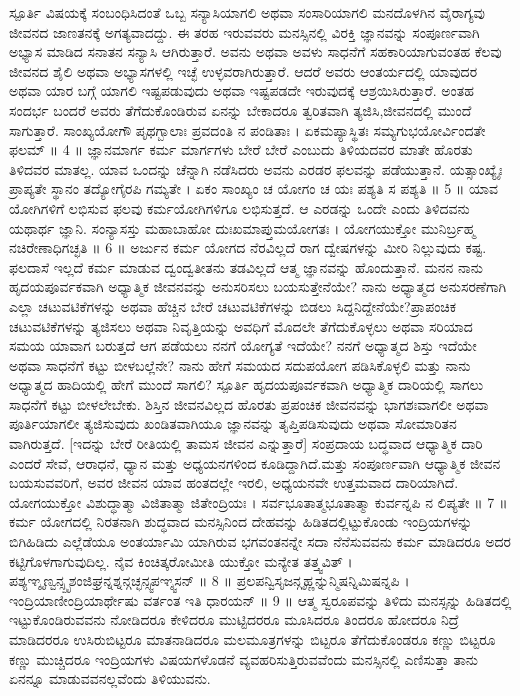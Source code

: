  ಸ್ಪೂರ್ತಿ 
 ವಿಷಯಕ್ಕೆ ಸಂಬಂಧಿಸಿದಂತೆ ಒಬ್ಬ ಸನ್ಯಾಸಿಯಾಗಲಿ ಅಥವಾ ಸಂಸಾರಿಯಾಗಲಿ ಮನದೊಳಗಿನ ವೈರಾಗ್ಯವು ಜೀವನದ ಜಾಣತನಕ್ಕೆ ಅಗತ್ಯವಾದದ್ದು. ಈ ತರಹ ಇರುವವರು ಮನಸ್ಸಿನಲ್ಲಿ ವಿರಕ್ತಿ ಜ್ಞಾನವನ್ನು ಸಂಪೂರ್ಣವಾಗಿ ಅಭ್ಯಾಸ ಮಾಡಿದ ಸನಾತನ ಸನ್ಯಾಸಿ ಆಗಿರುತ್ತಾರೆ. ಅವನು ಅಥವಾ ಅವಳು ಸಾಧನೆಗೆ ಸಹಕಾರಿಯಾಗುವಂತಹ ಕೆಲವು ಜೀವನದ ಶೈಲಿ ಅಥವಾ ಅಭ್ಯಾಸಗಳಲ್ಲಿ ಇಚ್ಛೆ ಉಳ್ಳವರಾಗಿರುತ್ತಾರೆ. ಆದರೆ ಅವರು ಆಂತರ್ಯದಲ್ಲಿ ಯಾವುದರ ಅಥವಾ ಯಾರ ಬಗ್ಗೆ ಯಾಗಲಿ ಇಷ್ಟಪಡುವುದು ಅಥವಾ ಇಷ್ಟಪಡದೇ ಇರುವುದಕ್ಕೆ ಆಶ್ರಯಿಸಿರುತ್ತಾರೆ. ಅಂತಹ ಸಂದರ್ಭ ಬಂದರೆ ಅವರು ತೆಗೆದುಕೊಂಡಿರುವ ಏನನ್ನು ಬೇಕಾದರೂ ತ್ವರಿತವಾಗಿ ತ್ಯಜಿಸಿ,ಜೀವನದಲ್ಲಿ ಮುಂದೆ ಸಾಗುತ್ತಾರೆ.
ಸಾಂಖ್ಯಯೋಗೌ ಪೃಥಗ್ಬಾಲಾಃ ಪ್ರವದಂತಿ ನ ಪಂಡಿತಾಃ ।
ಏಕಮಪ್ಯಾಸ್ಥಿತಃ ಸಮ್ಯಗುಭಯೋರ್ವಿಂದತೇ ಫಲಮ್ ॥ 4  ॥
 ಜ್ಞಾನಮಾರ್ಗ ಕರ್ಮ ಮಾರ್ಗಗಳು ಬೇರೆ ಬೇರೆ ಎಂಬುದು ತಿಳಿಯದವರ ಮಾತೇ ಹೊರತು ತಿಳಿದವರ ಮಾತಲ್ಲ. ಯಾವ ಒಂದನ್ನು ಚೆನ್ನಾಗಿ ನಡೆಸಿದರು ಅವನು ಎರಡರ ಫಲವನ್ನು ಪಡೆಯುತ್ತಾನೆ.
ಯತ್ಸಾಂಖ್ಯೈಃ ಪ್ರಾಪ್ಯತೇ ಸ್ಥಾನಂ ತದ್ಯೋಗೈರಪಿ ಗಮ್ಯತೇ ।
ಏಕಂ ಸಾಂಖ್ಯಂ ಚ ಯೋಗಂ ಚ ಯಃ ಪಶ್ಯತಿ ಸ ಪಶ್ಯತಿ ॥ 5 ॥
 ಯಾವ ಯೋಗಿಗಳಿಗೆ ಲಭಿಸುವ ಫಲವು ಕರ್ಮಯೋಗಿಗಳಿಗೂ ಲಭಿಸುತ್ತದೆ. ಆ ಎರಡನ್ನು ಒಂದೇ ಎಂದು ತಿಳಿದವನು ಯಥಾರ್ಥ ಜ್ಞಾನಿ.
ಸಂನ್ಯಾಸಸ್ತು ಮಹಾಬಾಹೋ ದುಃಖಮಾಪ್ತುಮಯೋಗತಃ ।
ಯೋಗಯುಕ್ತೋ ಮುನಿರ್ಬ್ರಹ್ಮ ನಚಿರೇಣಾಧಿಗಚ್ಛತಿ ॥ 6 ॥
 ಅರ್ಜುನ ಕರ್ಮ ಯೋಗದ ನೆರವಿಲ್ಲದೆ ರಾಗ ದ್ವೇಷಗಳನ್ನು ಮೀರಿ ನಿಲ್ಲುವುದು ಕಷ್ಟ. ಫಲದಾಸೆ ಇಲ್ಲದೆ ಕರ್ಮ ಮಾಡುವ ದ್ವಂದ್ವತೀತನು ತಡವಿಲ್ಲದೆ ಆತ್ಮ ಜ್ಞಾನವನ್ನು ಹೊಂದುತ್ತಾನೆ.
ಮನನ 
ನಾನು ಹೃದಯಪೂರ್ವಕವಾಗಿ ಅಧ್ಯಾತ್ಮಿಕ ಜೀವನವನ್ನು ಅನುಸರಿಸಲು ಬಯಸುತ್ತೇನೆಯೇ? ನಾನು ಅಧ್ಯಾತ್ಮದ ಅನುಸರಣೆಗಾಗಿ ಎಲ್ಲಾ ಚಟುವಟಿಕೆಗಳನ್ನು ಅಥವಾ ಹೆಚ್ಚಿನ ಬೇರೆ ಚಟುವಟಿಕೆಗಳನ್ನು ಬಿಡಲು ಸಿದ್ದನಿದ್ದೇನೆಯೇ?ಪ್ರಾಪಂಚಿಕ ಚಟುವಟಿಕೆಗಳನ್ನು ತ್ಯಜಿಸಲು ಅಥವಾ ನಿವೃತ್ತಿಯನ್ನು ಅವಧಿಗೆ ಮೊದಲೇ ತೆಗೆದುಕೊಳ್ಳಲು ಅಥವಾ ಸರಿಯಾದ ಸಮಯ ಯಾವಾಗ ಬರುತ್ತದೆ ಆಗ ಪಡೆಯಲು ನನಗೆ ಯೋಗ್ಯತೆ ಇದೆಯೇ? ನನಗೆ ಅಧ್ಯಾತ್ಮದ ಶಿಸ್ತು ಇದೆಯೇ ಅಥವಾ ಸಾಧನೆಗೆ ಕಟ್ಟು ಬೀಳಬಲ್ಲೆನೇ? ನಾನು ಹೇಗೆ ಸಮಯದ ಸದುಪಯೋಗ ಪಡಿಸಿಕೊಳ್ಳಲಿ ಮತ್ತು ನಾನು ಅಧ್ಯಾತ್ಮದ ಹಾದಿಯಲ್ಲಿ ಹೇಗೆ ಮುಂದೆ ಸಾಗಲಿ?
 ಸ್ಪೂರ್ತಿ 
 ಹೃದಯಪೂರ್ವಕವಾಗಿ ಅಧ್ಯಾತ್ಮಿಕ ದಾರಿಯಲ್ಲಿ ಸಾಗಲು ಸಾಧನೆಗೆ ಕಟ್ಟು ಬೀಳಲೇಬೇಕು. ಶಿಸ್ತಿನ ಜೀವನವಿಲ್ಲದ ಹೊರತು ಪ್ರಪಂಚಿಕ ಜೀವನವನ್ನು ಭಾಗಶಃವಾಗಲೀ ಅಥವಾ ಪೂರ್ತಿಯಾಗಲೀ ತ್ಯಜಿಸುವುದು ಖಂಡಿತವಾಗಿಯೂ ಜ್ಞಾನವನ್ನು ತೃಪ್ತಿಪಡಿಸುವುದು ಅಥವಾ ಸೋಮಾರಿತನ ವಾಗಿರುತ್ತದೆ. [ಇದನ್ನು ಬೇರೆ ರೀತಿಯಲ್ಲಿ ತಾಮಸ ಜೀವನ ಎನ್ನುತ್ತಾರೆ] ಸಂಪ್ರದಾಯ ಬದ್ಧವಾದ ಆಧ್ಯಾತ್ಮಿಕ ದಾರಿ ಎಂದರೆ ಸೇವೆ, ಆರಾಧನೆ, ಧ್ಯಾನ ಮತ್ತು ಅಧ್ಯಯನಗಳಿಂದ ಕೂಡಿದ್ದಾಗಿದೆ.ಮತ್ತು ಸಂಪೂರ್ಣವಾಗಿ ಆಧ್ಯಾತ್ಮಿಕ ಜೀವನ ಬಯಸುವವರಿಗೆ, ಅವರ ಜೀವನ ಯಾವ ಹಂತದಲ್ಲೇ ಇರಲಿ, ಅಧ್ಯಯನವೇ ಉತ್ತಮವಾದ ದಾರಿಯಾಗಿದೆ.
ಯೋಗಯುಕ್ತೋ ವಿಶುದ್ಧಾತ್ಮಾ ವಿಜಿತಾತ್ಮಾ ಜಿತೇಂದ್ರಿಯಃ ।
ಸರ್ವಭೂತಾತ್ಮಭೂತಾತ್ಮಾ ಕುರ್ವನ್ನಪಿ ನ ಲಿಪ್ಯತೇ ॥ 7 ॥
 ಕರ್ಮ ಯೋಗದಲ್ಲಿ ನಿರತನಾಗಿ ಶುದ್ಧವಾದ ಮನಸ್ಸಿನಿಂದ ದೇಹವನ್ನು ಹಿಡಿತದಲ್ಲಿಟ್ಟುಕೊಂಡು ಇಂದ್ರಿಯಗಳನ್ನು ಬಿಗಿಹಿಡಿದು ಎಲ್ಲೆಡೆಯೂ ಅಂತರ್ಯಾಮಿ ಯಾಗಿರುವ ಭಗವಂತನನ್ನೇ ಸದಾ ನೆನೆಸುವವನು ಕರ್ಮ ಮಾಡಿದರೂ ಅದರ ಕಟ್ಟಿಗೊಳಗಾಗುವುದಿಲ್ಲ.
ನೈವ ಕಿಂಚಿತ್ಕರೋಮೀತಿ ಯುಕ್ತೋ ಮನ್ಯೇತ ತತ್ತ್ವವಿತ್ ।
ಪಶ್ಯಞ್ಶೃಣ್ವನ್ಸ್ಪೃಶಂಜಿಘ್ರನ್ನಶ್ನನ್ಗಚ್ಛನ್ಸ್ವಪಞ್ಶ್ವಸನ್ ॥ 8 ॥
ಪ್ರಲಪನ್ವಿಸೃಜನ್ಗೃಹ್ಣನ್ನುನ್ಮಿಷನ್ನಿಮಿಷನ್ನಪಿ ।
ಇಂದ್ರಿಯಾಣೀಂದ್ರಿಯಾರ್ಥೇಷು ವರ್ತಂತ ಇತಿ ಧಾರಯನ್ ॥ 9 ॥
 ಆತ್ಮ ಸ್ವರೂಪವನ್ನು ತಿಳಿದು ಮನಸ್ಸನ್ನು ಹಿಡಿತದಲ್ಲಿ ಇಟ್ಟುಕೊಂಡಿರುವವನು ನೋಡಿದರೂ ಕೇಳಿದರೂ ಮುಟ್ಟಿದರರೂ ಮೂಸಿದರೂ ತಿಂದರೂ ಹೋದರೂ ನಿದ್ರೆ ಮಾಡಿದರರೂ ಉಸಿರುಬಿಟ್ಟರೂ ಮಾತನಾಡಿದರೂ ಮಲಮೂತ್ರಗಳನ್ನು ಬಿಟ್ಟರೂ ತೆಗೆದುಕೊಂಡರೂ ಕಣ್ಣು ಬಿಟ್ಟರೂ ಕಣ್ಣು ಮುಚ್ಚಿದರೂ ಇಂದ್ರಿಯಗಳು ವಿಷಯಗಳೊಡನೆ ವ್ಯವಹರಿಸುತ್ತಿರುವವೆಂದು ಮನಸ್ಸಿನಲ್ಲಿ ಎಣಿಸುತ್ತಾ ತಾನು ಏನನ್ನೂ ಮಾಡುವವನಲ್ಲವೆಂದು ತಿಳಿಯುವನು.
